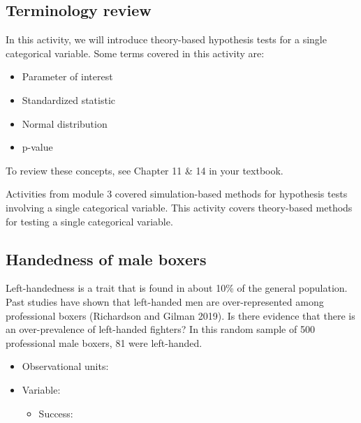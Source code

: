 \documentclass[
]{report}
\providecommand{\tightlist}{%
  \setlength{\itemsep}{0pt}\setlength{\parskip}{0pt}}
\begin{document}
\subsection{Terminology review}\label{terminology-review-5}

In this activity, we will introduce theory-based hypothesis tests for a single categorical variable. Some terms covered in this activity are:

\begin{itemize}
\item
  Parameter of interest
\item
  Standardized statistic
\item
  Normal distribution
\item
  p-value
\end{itemize}

To review these concepts, see Chapter 11 \& 14 in your textbook.

Activities from module 3 covered simulation-based methods for hypothesis tests involving a single categorical variable. This activity covers theory-based methods for testing a single categorical variable.

\subsection{Handedness of male boxers}\label{handedness-of-male-boxers}

Left-handedness is a trait that is found in about 10\% of the general population. Past studies have shown that left-handed men are over-represented among professional boxers (Richardson and Gilman 2019). Is there evidence that there is an over-prevalence of left-handed fighters? In this random sample of 500 professional male boxers, 81 were left-handed.

\vspace{2mm}

\begin{itemize}
\tightlist
\item
  Observational units:
\end{itemize}

\vspace{2mm}

\begin{itemize}
\item
  Variable:

  \begin{itemize}
  \tightlist
  \item
    Success:
  \end{itemize}
\end{itemize}
\end{document}
